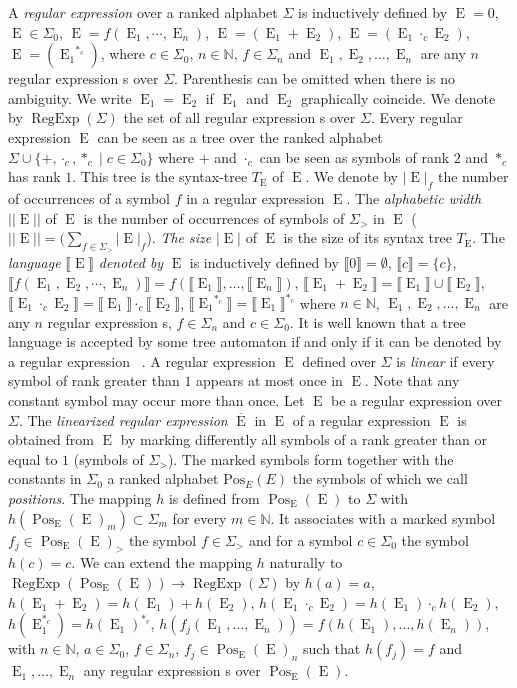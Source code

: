 \documentclass{llncs}
\DeclareMathOperator{\Pos}{Pos}
\def\regw#1{\Reg{(#1)}}
\DeclareMathOperator{\Reg}{RegExp}
\DeclareMathOperator{\E}{E}
\def\b#1{\overline{#1}}
\def\Po#1#2{\Pos_{#1}{(#2)}}
\begin{document}
A \emph{regular expression } over a ranked alphabet $\Sigma$ is inductively defined by  $\E=0$, $\E\in \Sigma_0$, $\E=f(\E_1, \cdots, \E_n)$, $\E=(\E_1+\E_2)$, $\E=(\E_1\cdot_c \E_2)$, $\E=({\E_1}^{*_c})$, where $c\in\Sigma_0$, $n\in\mathbb{N}$, $f\in\Sigma_n$ and $\E_1,\E_2 ,\dots, \E_n$ are any $n$ regular expression s over $\Sigma$. Parenthesis can be omitted when there is no ambiguity. We write $\E_1=\E_2$ if $\E_1$ and $\E_2$ graphically coincide. We denote by $\regw{\Sigma}$ the set of all regular expression s over $\Sigma$. Every regular expression  $\E$ can be seen as a tree over the ranked alphabet $\Sigma\cup \{+,\cdot_c, *_c \mid c\in \Sigma_0\}$ where $+$ and $\cdot_c$ can be seen as symbols
 of rank $2$ and $*_c$ has rank $1$. This tree is the syntax-tree $T_{\E}$ of $\E$. We denote by ${|\E|}_f$ the number of occurrences of a symbol $f$ in a regular expression $\E$. The \emph{alphabetic width} $||\E||$ of $\E$ is the number of occurrences of symbols of $\Sigma_{>}$ in $\E$ ( $||\E||=(\sum_{f\in\Sigma_{>}}{|\E|}_f$). \emph{The size} $|\E|$ of $\E$ is the size of its syntax tree $T_{\E}$. The \emph{language} $\llbracket \E\rrbracket$  \emph{denoted by} $\E$ is inductively defined by
 $\llbracket 0\rrbracket=\emptyset$, $\llbracket c\rrbracket=\lbrace c\rbrace$, $\llbracket f(\E_1,\E_2 , \cdots, \E_n)\rrbracket= f(\llbracket \E_1 \rrbracket, \dots, \llbracket \E_n \rrbracket)$, $\llbracket \E_1+ \E_2\rrbracket=\llbracket \E_1\rrbracket\cup\llbracket \E_2 \rrbracket$, $\llbracket \E_1\cdot_{c} \E_2\rrbracket=\llbracket \E_1\rrbracket \cdot_{c}\llbracket \E_2 \rrbracket$, $\llbracket {\E_1}^{*_c}\rrbracket=\llbracket \E_1\rrbracket^{*_c}$ where  $n\in\mathbb{N}$, $\E_1,\E_2,\dots, \E_n$ are any $n$ regular expression s, $f\in\Sigma_n$  and $c\in \Sigma_0$. It is well known that a tree language  is accepted by some tree automaton if and only if it can be denoted by a regular expression  ~\cite{automate1,automate2}.
A regular expression  $\E$ defined over $\Sigma$ is  \emph{linear} 
if every symbol of rank greater than $1$ appears at most once in $\E$. Note that any constant symbol may occur more than once. Let $\E$ be a regular expression  over $\Sigma$. The  \emph{linearized regular expression } $\b\E$ in $\E$ of a regular expression  $\E$ is obtained from $\E$ by marking differently all symbols of a rank  greater than or equal to $1$ (symbols of $\Sigma_>$). The marked symbols form together with the constants in $\Sigma_0$ a ranked alphabet $\mathrm{Pos}_E(E)$ the symbols of which we call \emph{positions}.
The mapping $h$ is defined from $\Po{\E}{\E}$ to $\Sigma$ with $h(\Po{\E}{\E}_m)\subset \Sigma_m$ for every  $m\in \mathbb{N}$. It associates with a marked symbol $f_j\in  \Po{\E}{\E}_{>}$ the symbol $f\in \Sigma_>$ and for a symbol $c\in \Sigma_0$ the symbol $h(c)=c$.
We can extend the mapping $h$ naturally to  $\regw{\Po{\E}{\E}}\rightarrow\regw{\Sigma}$ by $h(a)=a$, $h(\E_1+\E_2)=h(\E_1)+h(\E_2)$, $h(\E_1\cdot_c\E_2)=h(\E_1)\cdot_c h(\E_2)$, $h(\E_1^{*_c})=h(\E_1)^{*_c}$, $h(f_j(\E_1,\dots,\E_n))=f(h(\E_1),\dots,h(\E_n))$, with $n\in\mathbb{N}$, $a\in \Sigma_0$, $f\in \Sigma_n$, $f_j\in \Po{\E}{\E}_n$ such that $h(f_j)=f$ and $\E_1,\dots,\E_n$ any regular expression s over $\Po{\E}{\E}$. 
\end{document}
